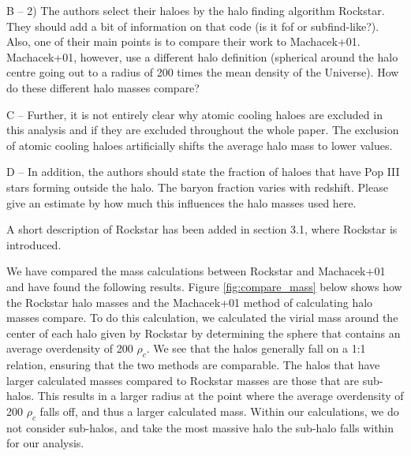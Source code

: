 \documentclass[11pt]{article}
\newenvironment{referee}[1][]{%
    \ignorespaces%
    \begin{mdframed}[style=myquotestyle,#1]%
}{%
    \end{mdframed}%
    \ignorespacesafterend%
}%
\begin{document}
\begin{referee}
B -- 2) The authors select their haloes by the halo finding algorithm Rockstar. They should add a bit of information on that code (is it fof or subfind-like?). Also, one of their main points is to compare their work to Machacek+01. Machacek+01, however, use a different halo definition (spherical around the halo centre going out to a radius of 200 times the mean density of the Universe). How do these different halo masses compare?

C -- Further, it is not entirely clear why atomic cooling haloes are excluded in this analysis and if they are excluded throughout the whole paper. The exclusion of atomic cooling haloes artificially shifts the average halo mass to lower values.

D -- In addition, the authors should state the fraction of haloes that have Pop III stars forming outside the halo. The baryon fraction varies with redshift. Please give an estimate by how much this influences the halo masses used here.
\end{referee}

A short description of Rockstar has been added in section 3.1, where Rockstar is introduced.

We have compared the mass calculations between Rockstar and Machacek+01 and have found the following results. Figure \ref{fig:compare_mass} below shows how the Rockstar halo masses and the Machacek+01 method of calculating halo masses compare. To do this calculation, we calculated the virial mass around the center of each halo given by Rockstar by determining the sphere that contains an average overdensity of 200 $\rho_{c}$. We see that the halos generally fall on a 1:1 relation, ensuring that the two methods are comparable. The halos that have larger calculated masses compared to Rockstar masses are those that are sub-halos. This results in a larger radius at the point where the average overdensity of 200 $\rho_{c}$ falls off, and thus a larger calculated mass. Within our calculations, we do not consider sub-halos, and take the most massive halo the sub-halo falls within for our analysis.
\end{document}
